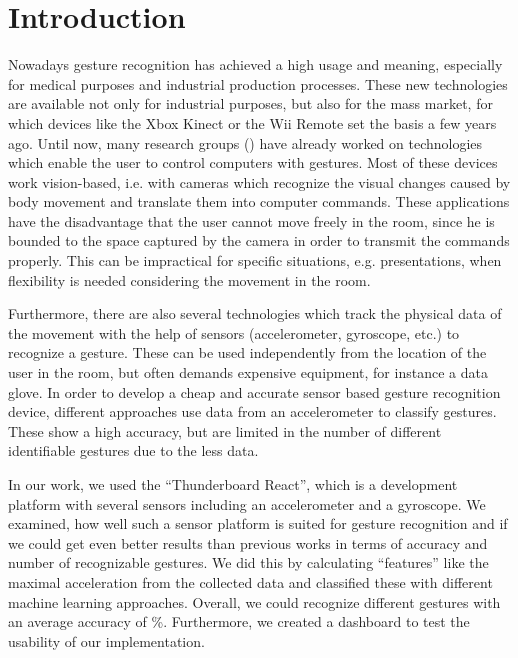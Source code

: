 
\chapter{Introduction}
\label{ch:Introduction}

Nowadays gesture recognition has achieved a high usage and meaning, especially for medical purposes and industrial production processes.
These new technologies are available not only for industrial purposes, but also for the mass market, for which devices like the Xbox Kinect or the Wii Remote set the basis a few years ago.
Until now, many research groups () have already worked on technologies which enable the user to control computers with gestures.
Most of these devices work vision-based, i.e. with cameras which recognize the visual changes caused by body movement and translate them into computer commands.
These applications have the disadvantage that the user cannot move freely in the room, since he is bounded to the space captured by the camera in order to transmit the commands properly.
This can be impractical for specific situations, e.g. presentations, when flexibility is needed considering the movement in the room.

Furthermore, there are also several technologies which track the physical data of the movement with the help of sensors (accelerometer, gyroscope, etc.) to recognize a gesture.
These can be used independently from the location of the user in the room, but often demands expensive equipment, for instance a data glove.
In order to develop a cheap and accurate sensor based gesture recognition device, different approaches use data from an accelerometer to classify gestures.
These show a high accuracy, but are limited in the number of different identifiable gestures due to the less data.

In our work, we used the “Thunderboard React”, which is a development platform with several sensors including an accelerometer and a gyroscope.
We examined, how well such a sensor platform is suited for gesture recognition and if we could get even better results than previous works in terms of accuracy and number of recognizable gestures.
We did this by calculating “features” like the maximal acceleration from the collected data and classified these with different machine learning approaches.
Overall, we could recognize  different gestures with an average accuracy of \%.
Furthermore, we created a dashboard to test the usability of our implementation.